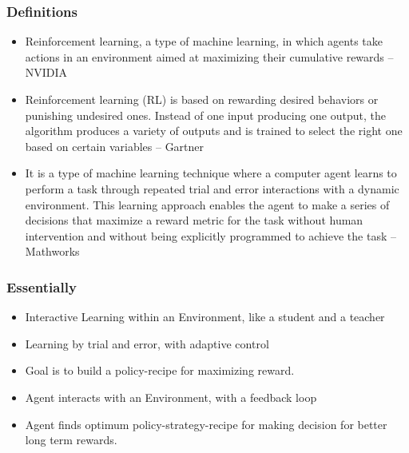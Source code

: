 \begin{frame}[fragile]\frametitle{Definitions}
\begin{itemize}
\item Reinforcement learning, a type of machine learning, in which agents take actions in an environment aimed at maximizing their cumulative rewards – NVIDIA

\item Reinforcement learning (RL) is based on rewarding desired behaviors or punishing undesired ones. Instead of one input producing one output, the algorithm produces a variety of outputs and is trained to select the right one based on certain variables – Gartner

\item It is a type of machine learning technique where a computer agent learns to perform a task through repeated trial and error interactions with a dynamic environment. This learning approach enables the agent to make a series of decisions that maximize a reward metric for the task without human intervention and without being explicitly programmed to achieve the task – Mathworks
\end{itemize}
\end{frame}

\begin{frame}[fragile]\frametitle{Essentially}
\begin{itemize}
\item Interactive Learning within an Environment, like a student and a teacher
\item Learning by trial and error, with adaptive control
\item Goal is to build a policy-recipe for maximizing reward.
\item Agent interacts with an Environment, with a feedback loop
\item Agent finds optimum policy-strategy-recipe for making decision for better long term rewards.
\end{itemize}
\end{frame}

